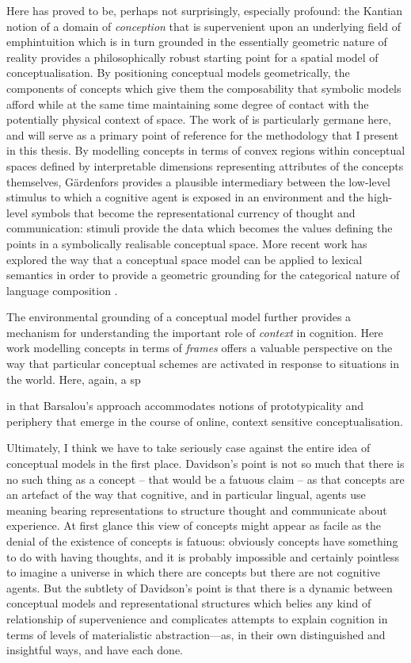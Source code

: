 Here \cite{Kant} has proved to be, perhaps not surprisingly, especially profound: the Kantian notion of a domain of \emph{conception} that is supervenient upon an underlying field of emph{intuition} which is in turn grounded in the essentially geometric nature of reality provides a philosophically robust starting point for a spatial model of conceptualisation.  By positioning conceptual models geometrically, the components of concepts which give them the composability that symbolic models afford while at the same time maintaining some degree of contact with the potentially physical context of space.  The work of \cite{Gardenfors2000} is particularly germane here, and will serve as a primary point of reference for the methodology that I present in this thesis.  By modelling concepts in terms of convex regions within conceptual spaces defined by interpretable dimensions representing attributes of the concepts themselves, G\"{a}rdenfors provides a plausible intermediary between the low-level stimulus to which a cognitive agent is exposed in an environment and the high-level symbols that become the representational currency of thought and communication: stimuli provide the data which becomes the values defining the points in a symbolically realisable conceptual space.  More recent work has explored the way that a conceptual space model can be applied to lexical semantics in order to provide a geometric grounding for the categorical nature of language composition \citep{Gardenfors2016}.

The environmental grounding of a conceptual model further provides a mechanism for understanding the important role of \emph{context} in cognition.  Here  work modelling concepts in terms of \emph{frames} offers a valuable perspective on the way that particular conceptual schemes are activated in response to situations in the world.  Here, again, a sp

in that Barsalou's approach accommodates notions of prototypicality and periphery that emerge in the course of online, context sensitive conceptualisation.

Ultimately, I think we have to take seriously  case against the entire idea of conceptual models in the first place.  Davidson's point is not so much that there is no such thing as a concept -- that would be a fatuous claim -- as that concepts are an artefact of the way that cognitive, and in particular lingual, agents use meaning bearing representations to structure thought and communicate about experience.  At first glance this view of concepts might appear as facile as the denial of the existence of concepts is fatuous: obviously concepts have something to do with having thoughts, and it is probably impossible and certainly pointless to imagine a universe in which there are concepts but there are not cognitive agents.  But the subtlety of Davidson's point is that there is a dynamic between conceptual models and representational structures which belies any kind of relationship of supervenience and complicates attempts to explain cognition in terms of levels of materialistic abstraction---as, in their own distinguished and insightful ways, \cite{Floridi} and \cite{Deacon} have each done.

